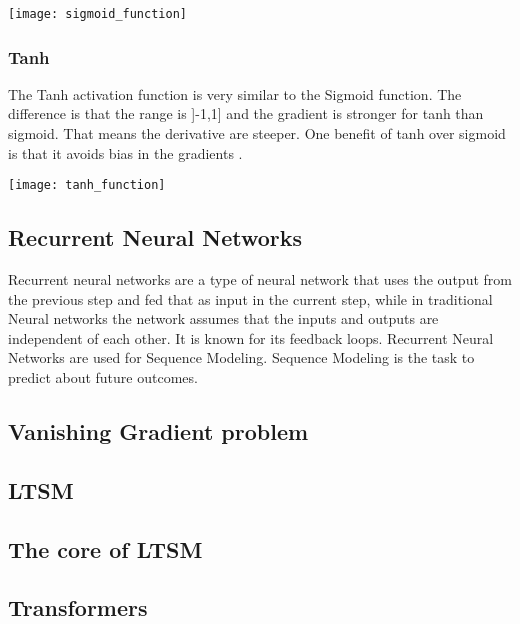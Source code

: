 \texttt{[image: sigmoid\_function]}

\subsubsection{Tanh}
The Tanh activation function is very similar to the Sigmoid function. The difference is that the range is ]-1,1] and the gradient is stronger for tanh than sigmoid. That means the derivative are steeper. One benefit of tanh over sigmoid is that it avoids bias in the gradients \cite{tanh}.

\texttt{[image: tanh\_function]}

\subsection{Recurrent Neural Networks}
Recurrent neural networks are a type of neural network that uses the output from the previous step and fed that as input in the current step, while in traditional Neural networks the network assumes that the inputs and outputs are independent of each other. It is known for its feedback loops. Recurrent Neural Networks are used for Sequence Modeling. Sequence Modeling is the task to predict about future outcomes. 


\subsection{Vanishing Gradient problem}
\subsection{LTSM}
\subsection{The core of LTSM}
\subsection{Transformers}